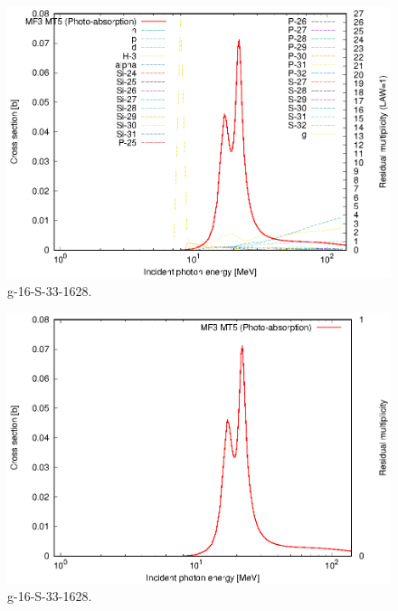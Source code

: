 \begin{figure}
 \includegraphics[width=\linewidth]{eps/g_16-S-33_1628.eps}
  \caption{g-16-S-33-1628.}
\end{figure}
\begin{figure}
 \includegraphics[width=\linewidth]{eps-law0/g_16-S-33_1628.eps}
 \caption{g-16-S-33-1628.}
\end{figure}
\newpage \clearpage

